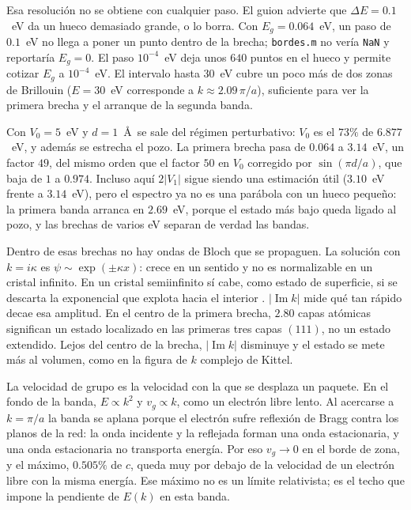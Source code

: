 \documentclass[hidelinks]{article}
\begin{document}
Esa resolución no se obtiene con cualquier paso. El guion advierte que $\Delta E=0.1$~eV da un hueco demasiado grande, o lo borra. Con $E_g=0.064$~eV, un paso de $0.1$~eV no llega a poner un punto dentro de la brecha; \texttt{bordes.m} no vería \texttt{NaN} y reportaría $E_g=0$. El paso $10^{-4}$~eV deja unos $640$ puntos en el hueco y permite cotizar $E_g$ a $10^{-4}$~eV. El intervalo hasta $30$~eV cubre un poco más de dos zonas de Brillouin ($E=30$~eV corresponde a $k\approx 2.09\,\pi/a$), suficiente para ver la primera brecha y el arranque de la segunda banda.

Con $V_0=5$~eV y $d=1$~\AA\ se sale del régimen perturbativo: $V_0$ es el $73\%$ de $6.877$~eV, y además se estrecha el pozo. La primera brecha pasa de $0.064$ a $3.14$~eV, un factor $49$, del mismo orden que el factor $50$ en $V_0$ corregido por $\sin(\pi d/a)$, que baja de $1$ a $0.974$. Incluso aquí $2|V_1|$ sigue siendo una estimación útil ($3.10$~eV frente a $3.14$~eV), pero el espectro ya no es una parábola con un hueco pequeño: la primera banda arranca en $2.69$~eV, porque el estado más bajo queda ligado al pozo, y las brechas de varios eV separan de verdad las bandas.

Dentro de esas brechas no hay ondas de Bloch que se propaguen. La solución con $k=i\kappa$ es $\psi\sim\exp(\pm\kappa x)$: crece en un sentido y no es normalizable en un cristal infinito. En un cristal semiinfinito sí cabe, como estado de superficie, si se descarta la exponencial que explota hacia el interior \cite{kittel}. $|\operatorname{Im}k|$ mide qué tan rápido decae esa amplitud. En el centro de la primera brecha, $2.80$ capas atómicas significan un estado localizado en las primeras tres capas $(111)$, no un estado extendido. Lejos del centro de la brecha, $|\operatorname{Im}k|$ disminuye y el estado se mete más al volumen, como en la figura de $k$ complejo de Kittel.

La velocidad de grupo es la velocidad con la que se desplaza un paquete. En el fondo de la banda, $E\propto k^2$ y $v_g\propto k$, como un electrón libre lento. Al acercarse a $k=\pi/a$ la banda se aplana porque el electrón sufre reflexión de Bragg contra los planos de la red: la onda incidente y la reflejada forman una onda estacionaria, y una onda estacionaria no transporta energía. Por eso $v_g\to 0$ en el borde de zona, y el máximo, $0.505\%$ de $c$, queda muy por debajo de la velocidad de un electrón libre con la misma energía. Ese máximo no es un límite relativista; es el techo que impone la pendiente de $E(k)$ en esta banda.
\end{document}
